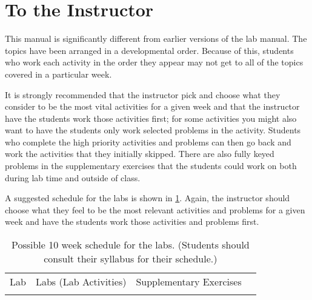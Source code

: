 \documentclass[12pt,draft,]{article}
\theoremstyle{plain}
\theoremstyle{definition}
\begin{document}
\section*{To the Instructor}\label{section-2}
%
This manual is significantly different from earlier versions of the lab manual. The topics have been
            arranged in a developmental order. Because of this, students who work each activity in the order
            they appear may not get to all of the topics covered in a particular week.
%
\par It is strongly recommended that the instructor pick and choose what they consider to be the most
            vital activities for a given week and that the instructor have the students work those activities
            first; for some activities you might also want to have the students only work selected problems in
            the activity. Students who complete the high priority activities and problems can then go back and
            work the activities that they initially skipped. There are also fully keyed problems in the
            supplementary exercises that the students could work on both during lab time and outside of class.
%
\par A suggested schedule for the labs is shown in \ref{table-1}. Again, the instructor should
            choose what they feel to be the most relevant activities and problems for a given week and have the 
            students work those activities and problems first.
%
\begin{table}[thb]\begin{center}
\label{table-1}\caption{Possible 10 week schedule for the labs. (Students should consult their syllabus for their schedule.)}
\begin{tabular}{*{4}{c}}
\hline\hline Lab&Labs (Lab Activities)&Supplementary Exercises\\
\\\hline\hline \end{tabular}
\end{center}\end{table}
%
\end{document}
